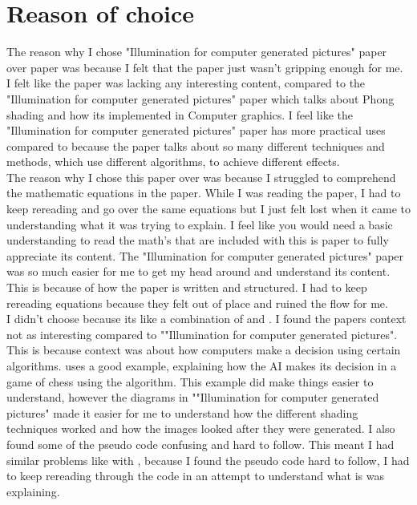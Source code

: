 \documentclass{scrartcl}
\begin{document}
	\section{Reason of choice}
	The reason why I chose "Illumination for computer generated pictures" paper over \cite{one} paper was because I felt that the paper just wasn’t gripping enough for me. I felt like the paper was lacking any interesting content, compared to the "Illumination for computer generated pictures" paper which talks about Phong shading and how its implemented in Computer graphics. I feel like the "Illumination for computer generated pictures" paper has more practical uses compared to \cite{one} because the paper talks about so many different techniques and methods, which use different algorithms, to achieve different effects.\\
	
	The reason why I chose this paper over \cite{two} was because I struggled to comprehend the mathematic equations in the paper. While I was reading the paper, I had to keep rereading and go over the same equations but I just felt lost when it came to understanding what it was trying to explain. I feel like you would need a basic understanding to read the math's that are included with this is paper to fully appreciate its content. The "Illumination for computer generated pictures" paper was so much easier for me to get my head around and understand its content. This is because of how the paper is written and structured. I had to keep rereading \cite{two} equations because they felt out of place and ruined the flow for me.\\
	
	I didn’t choose \cite{three} because its like a combination of \cite{one} and \cite{two}. I found the papers context not as interesting compared to ""Illumination for computer generated pictures". This is because \cite{three} context was about how computers make a decision using certain algorithms. \cite{three} uses a good example, explaining how the AI makes its decision in a game of chess using the algorithm. This example did make things easier to understand, however the diagrams in ""Illumination for computer generated pictures" made it easier for me to understand how the different shading techniques worked and how the images looked after they were generated. I also found some of the pseudo code confusing and hard to follow. This meant I had similar problems like with \cite{two}, because I found the pseudo code hard to follow, I had to keep rereading through the code in an attempt to understand what is was explaining.\\
	
\end{document}
